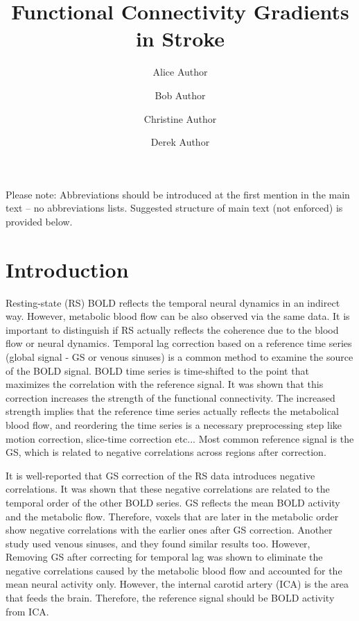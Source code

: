 \documentclass[fleqn,10pt]{wlscirep}
\title{Functional Connectivity Gradients in Stroke}
\author[1,*]{Alice Author}
\author[2]{Bob Author}
\author[1,2,+]{Christine Author}
\author[2,+]{Derek Author}
\affil[1]{Affiliation, department, city, postcode, country}
\affil[2]{Affiliation, department, city, postcode, country}
\affil[*]{corresponding.author@email.example}
\affil[+]{these authors contributed equally to this work}
\begin{document}
\flushbottom
\maketitle
%
%
\thispagestyle{empty}

\noindent Please note: Abbreviations should be introduced at the first mention in the main text – no abbreviations lists. Suggested structure of main text (not enforced) is provided below.

\section*{Introduction}

Resting-state (RS) BOLD reflects the temporal neural dynamics in an indirect way. However, metabolic blood flow can be also observed via the same data. \citet{mitra2014lag} It is important to distinguish if RS actually reflects the coherence due to the blood flow or neural dynamics. Temporal lag correction based on a reference time series (global signal - GS or venous sinuses) is a common method to examine the source of the BOLD signal. BOLD time series is time-shifted to the point that maximizes the correlation with the reference signal. It was shown that this correction increases the strength of the functional connectivity. The increased strength implies that the reference time series actually reflects the metabolical blood flow, and reordering the time series is a necessary preprocessing step like motion correction, slice-time correction etc... Most common reference signal is the GS, which is related to negative correlations across regions after correction. 

It is well-reported that GS correction of the RS data introduces negative correlations. It was shown that these negative correlations are related to the temporal order of the other BOLD series. GS reflects the mean BOLD activity and the metabolic flow. Therefore, voxels that are later in the metabolic order show negative correlations with the earlier ones after GS correction. Another study used venous sinuses, and they found similar results too. However, Removing GS after correcting for temporal lag was shown to eliminate the negative correlations caused by the metabolic blood flow and accounted for the mean neural activity only. However, the internal carotid artery (ICA) is the area that feeds the brain. Therefore, the reference signal should be BOLD activity from ICA. 
\end{document}
